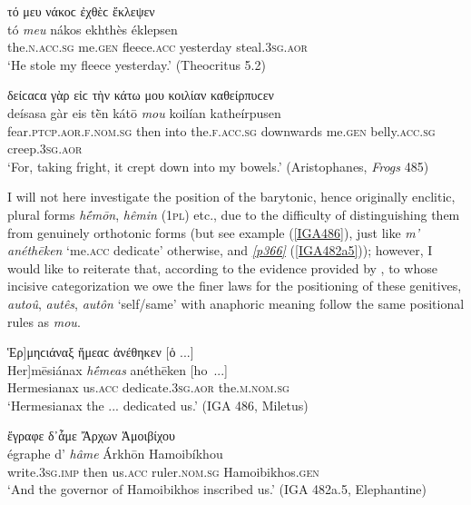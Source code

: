 \begin{exe}
\ex τό μευ νάκοϲ ἐχθὲϲ ἔκλεψεν\\
\gll tó \emph{meu} nákos ekhthès éklepsen\\
the.\textsc{n.acc.sg} me.\textsc{gen} fleece.\textsc{acc} yesterday steal.\textsc{3sg.aor}\\
\trans `He stole my fleece yesterday.' (Theocritus 5.2)
\label{artprep7}
\end{exe}

\begin{exe}
\ex δείϲαϲα γὰρ εἰϲ τὴν κάτω μου κοιλίαν καθείρπυϲεν\\
\gll deísasa gàr eis tḕn kátō \emph{mou} koilían katheírpusen\\
fear.\textsc{ptcp.aor.f.nom.sg} then into the.\textsc{f.acc.sg}
downwards me.\textsc{gen} belly.\textsc{acc.sg} creep.\textsc{3sg.aor}\\
\trans `For, taking fright, it crept down into my bowels.' (Aristophanes, \textit{Frogs} 485)
\label{Ran485}
\end{exe}

I will not here investigate the position of the barytonic, hence originally enclitic, plural forms \textit{hḗmōn}, \textit{hêmin} (\textsc{1pl}) etc., due to the difficulty of distinguishing them from genuinely orthotonic forms (but see example (\ref{IGA486}), just like \textit{m' anéthēken} `me.\textsc{acc} dedicate' otherwise, and \hyperlink{p366}{\emph{[p366]}} (\ref{IGA482a5})); however, I would like to reiterate that, according to the evidence provided by \citet{Krueger1871}, to whose incisive categorization we owe the finer laws for the positioning of these genitives, \textit{autoû}, \textit{autês}, \textit{autôn} `self/same' with anaphoric meaning follow the same positional rules as \textit{mou}.

\begin{exe}
\ex {[}Ἑρ{]}μηϲιάναξ ἥμεαϲ ἀνέθηκεν {[}ὁ ...{]}\\
\gll {[}Her{]}mēsiánax \emph{hḗmeas} anéthēken {[}ho~...{]}\\
Hermesianax us.\textsc{acc} dedicate.\textsc{3sg.aor} the.\textsc{m.nom.sg}\\
\trans `Hermesianax the ... dedicated us.' (IGA 486, Miletus)
\label{IGA486}
\end{exe}

\begin{exe}
\ex ἔγραφε δ᾽ἇμε Ἄρχων Ἁμοιβίχου\\
\gll égraphe d' \emph{hâme} Árkhōn Hamoibíkhou\\
write.\textsc{3sg.imp} then us.\textsc{acc} ruler.\textsc{nom.sg} Hamoibikhos.\textsc{gen}\\
\trans `And the governor of Hamoibikhos inscribed us.' (IGA 482a.5, Elephantine)
\label{IGA482a5}
\end{exe}

